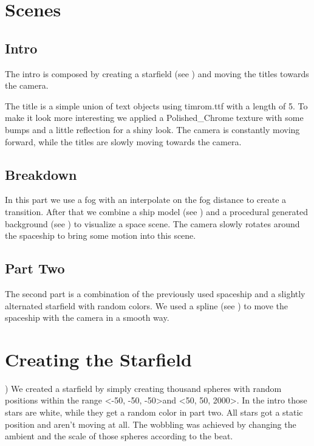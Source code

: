 \documentclass[a4paper, 12pt]{scrartcl}
\begin{document}
    \section{Scenes}
    \subsection{Intro}

    The intro is composed by creating a starfield (see ) and moving the titles towards the camera.

    The title is a simple union of text objects using timrom.ttf with a length of 5. To make
    it look more interesting we applied a Polished\_Chrome texture with some bumps and a little
    reflection for a shiny look. The camera is constantly moving forward, while the titles are
    slowly moving towards the camera.

    \subsection{Breakdown}

    In this part we use a fog with an interpolate on the fog distance to create a transition.
    After that we combine a ship model (see ) and a procedural generated background (see ) to visualize a space scene.
    The camera slowly rotates around the spaceship to bring some motion into this scene.

    \subsection{Part Two}

    The second part is a combination of the previously used spaceship and a slightly alternated starfield with random colors. We used a spline (see ) to move the spaceship with the camera in a smooth way.

    \section{Creating the Starfield}
    \label{sec:starfield})
    We created a starfield by simply creating thousand spheres with random positions within the range \textless-50, -50, -50\textgreater and \textless50, 50, 2000\textgreater. In the intro those stars are white, while they get a random color in part two. All stars got a static position and aren't moving at all.
    The wobbling was achieved by changing the ambient and the scale of those spheres according to the beat.
\end{document}
